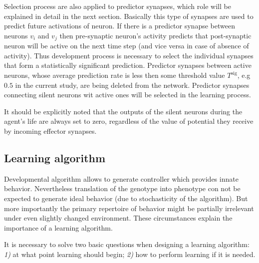 \documentclass[letterpaper]{article}
\begin{document}
Selection process are also applied to predictor synapses, which role will be explained in detail in the next section. Basically this type of synapses are used to predict future activations of neuron. If there is a predictor synapse between neurons $v_{i}$ and $v_{j}$ then pre-synaptic neuron's activity predicts that post-synaptic neuron will be active on the next time step (and vice versa in case of absence of activity). Thus development process is necessary to select the individual synapses that form a statistically significant prediction. Predictor synapses between active neurons, whose average prediction rate is less then some threshold value $T^{\mathrm{sig}}$, e.g $0.5$ in the current study, are being deleted from the network. Predictor synapses connecting silent neurons wit active ones will be selected in the learning process. 

It should be explicitly noted that the outputs of the silent neurons during the agent's life are always set to zero, regardless of the value of potential they receive by incoming effector synapses.     

\subsection{Learning algorithm} 

Developmental algorithm allows to generate controller which provides innate behavior. Nevertheless translation of the genotype into phenotype con not be expected to generate ideal behavior (due to stochasticity of the algorithm). But more importantly the primary repertoire of behavior might be partially irrelevant under even slightly changed environment. These circumstances explain the importance of a learning algorithm.

It is necessary to solve two basic questions when designing a learning algorithm: {\em 1)} at what point learning should begin; {\em 2)} how to perform learning if it is needed. 
\end{document}
